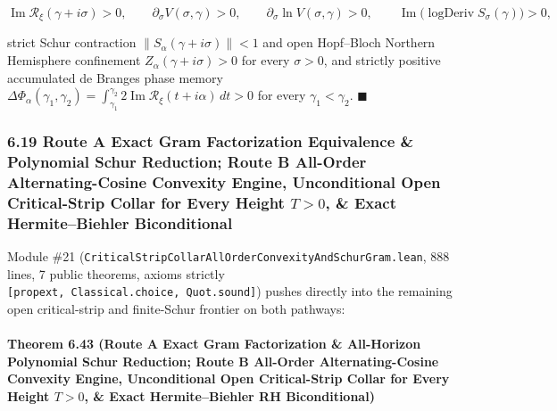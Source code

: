 \documentclass[
  11pt,
]{article}
\begin{document}
\begin{enumerate}
  \[\operatorname{Im}\mathcal{R}_\xi(\gamma + i\sigma) > 0, \qquad \partial_\sigma V(\sigma, \gamma) > 0, \qquad \partial_\sigma\ln V(\sigma, \gamma) > 0, \qquad \operatorname{Im}\big(\operatorname{logDeriv} S_\sigma(\gamma)\big) > 0,\]

  strict Schur contraction \(\|S_\alpha(\gamma + i\sigma)\| < 1\) and
  open Hopf--Bloch Northern Hemisphere confinement
  \(Z_\alpha(\gamma + i\sigma) > 0\) for every \(\sigma > 0\), and
  strictly positive accumulated de Branges phase memory
  \(\Delta\Phi_\alpha(\gamma_1, \gamma_2) = \int_{\gamma_1}^{\gamma_2} 2\operatorname{Im}\mathcal{R}_\xi(t + i\alpha)\,dt > 0\)
  for every \(\gamma_1 < \gamma_2\). \(\blacksquare\)
\end{enumerate}

\subsubsection{\texorpdfstring{6.19 Route A Exact Gram Factorization
Equivalence \& Polynomial Schur Reduction; Route B All-Order
Alternating-Cosine Convexity Engine, Unconditional Open Critical-Strip
Collar for Every Height \(T > 0\), \& Exact Hermite--Biehler
Biconditional}{6.19 Route A Exact Gram Factorization Equivalence \& Polynomial Schur Reduction; Route B All-Order Alternating-Cosine Convexity Engine, Unconditional Open Critical-Strip Collar for Every Height T \textgreater{} 0, \& Exact Hermite--Biehler Biconditional}}\label{route-a-exact-gram-factorization-equivalence-polynomial-schur-reduction-route-b-all-order-alternating-cosine-convexity-engine-unconditional-open-critical-strip-collar-for-every-height-t-0-exact-hermitebiehler-biconditional}

Module \#21
(\texttt{CriticalStripCollarAllOrderConvexityAndSchurGram.lean}, 888
lines, 7 public theorems, axioms strictly
\texttt{{[}propext,\ Classical.choice,\ Quot.sound{]}}) pushes directly
into the remaining open critical-strip and finite-Schur frontier on both
pathways:

\paragraph{\texorpdfstring{Theorem 6.43 (Route A Exact Gram
Factorization \& All-Horizon Polynomial Schur Reduction; Route B
All-Order Alternating-Cosine Convexity Engine, Unconditional Open
Critical-Strip Collar for Every Height \(T > 0\), \& Exact
Hermite--Biehler RH
Biconditional)}{Theorem 6.43 (Route A Exact Gram Factorization \& All-Horizon Polynomial Schur Reduction; Route B All-Order Alternating-Cosine Convexity Engine, Unconditional Open Critical-Strip Collar for Every Height T \textgreater{} 0, \& Exact Hermite--Biehler RH Biconditional)}}\label{theorem-6.43-route-a-exact-gram-factorization-all-horizon-polynomial-schur-reduction-route-b-all-order-alternating-cosine-convexity-engine-unconditional-open-critical-strip-collar-for-every-height-t-0-exact-hermitebiehler-rh-biconditional}
\end{document}
